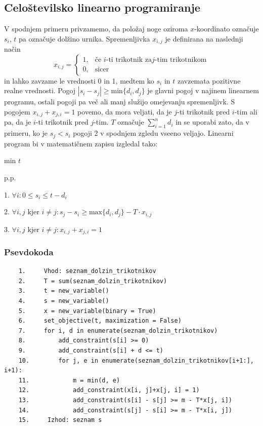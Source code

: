 \documentclass[a4paper,12pt]{article}
\theoremstyle{definition}
\theoremstyle{plain}
\begin{document}
\subsection{Celoštevilsko linearno programiranje}
V spodnjem primeru privzamemo, da položaj noge oziroma $x$-koordinato označuje $s_i$, $t$ pa označuje dolžino urnika. Spremenljivka $x_{i,j}$ je definirana na naslednji način
$$
x_{i,j} =
\left\{
	\begin{array}{ll}
		1,  & \mbox{če } i\text{-ti trikotnik za} j\text{-tim trikotnikom} \\
		0,  & \mbox{sicer } 
	\end{array}
\right.
$$
in lahko zavzame le vrednosti 0 in 1, medtem ko $s_i$ in $t$ zavzemata pozitivne realne vrednosti. Pogoj $|s_i-s_j| \geq \text{min}\{d_i,d_j\}$ je glavni pogoj v najinem linearnem programu, ostali pogoji pa več ali manj služijo omejevanju spremenljivk.
\newpage
S pogojem $x_{i,j}+x_{j,i}=1$ povemo, da mora veljati, da je $j$-ti trikotnik pred $i$-tim ali pa, da je $i$-ti trikotnik pred $j$-tim.
$T$ označuje $\sum_{i=1}^n d_i$ in se uporabi zato, da v primeru, ko je $s_j < s_i$ pogoji 2 v spodnjem zgledu vseeno veljajo.
Linearni program bi v matematičnem zapisu izgledal tako:
\begin{center}
    min $t$

    p.p.

    1.  $\forall i: 0 \leq s_i \leq t-d_i$

    \medskip

    2.  $\forall i,j \text{ kjer } i\neq j: s_j - s_i \geq \text{max}\{d_i,d_j\}-T\cdot x_{i,j}$
    \medskip

    3.  $\forall i,j \text{ kjer } i\neq j: x_{i,j}+x_{j,i}=1$
\end{center}
\subsubsection{Psevdokoda}
\begin{verbatim}
    1.     Vhod: seznam_dolzin_trikotnikov
    2.     T = sum(seznam_dolzin_trikotnikov)
    3.     t = new_variable()
    4.     s = new_variable()
    5.     x = new_variable(binary = True)
    6.     set_objective(t, maximization = False)
    7.     for i, d in enumerate(seznam_dolzin_trikotnikov)
    8.         add_constraint(s[i] >= 0)
    9.         add_constraint(s[i] + d <= t)
    10.        for j, e in enumerate(seznam_dolzin_trikotnikov[i+1:], i+1):
    11.            m = min(d, e)
    12.            add_constraint(x[i, j]+x[j, i] = 1)
    13.            add_constraint(s[i] - s[j] >= m - T*x[j, i])
    14.            add_constraint(s[j] - s[i] >= m - T*x[i, j])
    15.     Izhod: seznam s
\end{verbatim}
\end{document}
